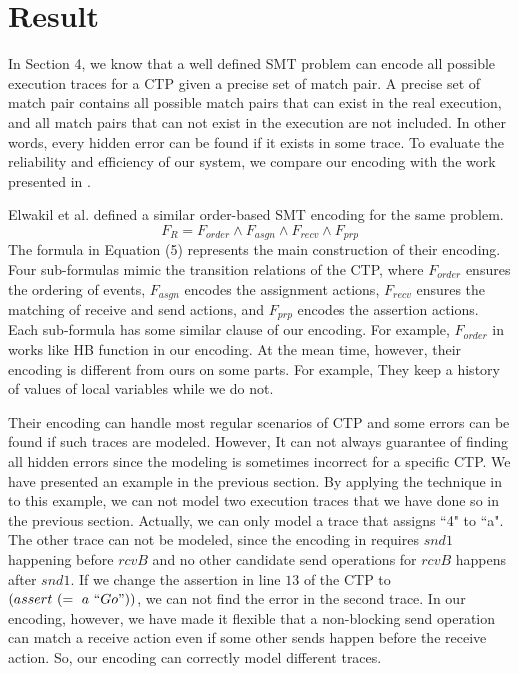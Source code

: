 \section{Result}
In Section 4, we know that a well defined SMT problem can encode all possible execution traces for a CTP given a precise set of match pair. A precise set of match pair contains all possible match pairs that can exist in the real execution, and all match pairs that can not exist in the execution are not included. In other words, every hidden error can be found if it exists in some trace. To evaluate the reliability and efficiency of our system, we compare our encoding with the work presented in \cite{elwakil:padtad10}.

Elwakil et al. defined a similar order-based SMT encoding for the same problem.
\begin{equation}
F_R = F_{order}\wedge F_{asgn}\wedge F_{recv}\wedge F_{prp}
\end{equation}
The formula in Equation (5) represents the main construction of their encoding. Four sub-formulas mimic the transition relations of the CTP, where $F_{order}$ ensures the ordering of events, $F_{asgn}$ encodes the assignment actions, $F_{recv}$ ensures the matching of receive and send actions, and $F_{prp}$ encodes the assertion actions. Each sub-formula has some similar clause of our encoding. For example, $F_{order}$ in \cite{elwakil:padtad10} works like HB function in our encoding. At the mean time, however, their encoding is different from ours on some parts. For example, They keep a history of values of local variables while we do not.

Their encoding can handle most regular scenarios of CTP and some errors can be found if such traces are modeled. However, It can not always guarantee of finding all hidden errors since the modeling is sometimes incorrect for a specific CTP. We have presented an example in the previous section. By applying the technique in \cite{elwakil:padtad10} to this example, we can not model two execution traces that we have done so in the previous section. Actually, we can only model a trace that assigns ``4" to ``a". The other trace can not be modeled, since the encoding in \cite{elwakil:padtad10} requires $snd1$ happening before $rcvB$ and no other candidate send operations for $rcvB$ happens after $snd1$. If we change the assertion in line $13$ of the CTP to $(assert\ (=\ a\ ``Go"))$, we can not find the error in the second trace. In our encoding, however, we have made it flexible that a non-blocking send operation can match a receive action even if some other sends happen before the receive action. So, our encoding can correctly model different traces.

